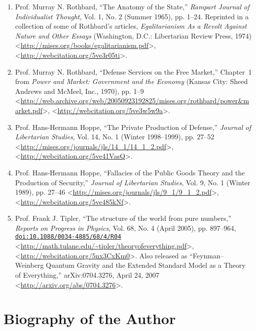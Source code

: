 \documentclass[letterpaper,12pt]{article}
\begin{document}
\begin{enumerate}
\small
\item Prof. Murray N. Rothbard, ``The Anatomy of the State,'' \emph{Rampart Journal of Individualist Thought}, Vol. 1, No. 2 (Summer 1965), pp. 1--24. Reprinted in a collection of some of Rothbard's articles, \emph{Egalitarianism As a Revolt Against Nature and Other Essays} (Washington, D.C.: Libertarian Review Press, 1974) \textless\url{http://mises.org/books/egalitarianism.pdf}\textgreater , \textless\url{http://webcitation.org/5ve3r05ti}\textgreater .

\item Prof. Murray N. Rothbard, ``Defense Services on the Free Market,'' Chapter~1 from \emph{Power and Market: Government and the Economy} (Kansas City: Sheed Andrews and McMeel, Inc., 1970), pp. 1--9 \textless\url{http://web.archive.org/web/20050923192825/mises.org/rothbard/power&market.pdf}\textgreater , \textless\url{http://webcitation.org/5ve3w5w9a}\textgreater .

\item Prof. Hans-Hermann Hoppe, ``The Private Production of Defense,'' \emph{Journal of Libertarian Studies}, Vol. 14, No. 1 (Winter 1998--1999), pp. 27--52 \textless\url{http://mises.org/journals/jls/14_1/14_1_2.pdf}\textgreater , \textless\url{http://webcitation.org/5ve41VasQ}\textgreater .

\item Prof. Hans-Hermann Hoppe, ``Fallacies of the Public Goods Theory and the Production of Security,'' \emph{Journal of Libertarian Studies}, Vol. 9, No. 1 (Winter 1989), pp. 27--46 \textless\url{http://mises.org/journals/jls/9_1/9_1_2.pdf}\textgreater , \textless\url{http://webcitation.org/5ve485kNf}\textgreater .

\item Prof. Frank J. Tipler, ``The structure of the world from pure numbers,'' \emph{Reports on Progress in Physics}, Vol. 68, No. 4 (April 2005), pp. 897--964, \href{http://dx.doi.org/10.1088/0034-4885/68/4/R04}{\nolinkurl{doi:10.1088/0034-4885/68/4/R04}} \textless\url{http://math.tulane.edu/~tipler/theoryofeverything.pdf}\textgreater , \textless\url{http://webcitation.org/5nx3CxKm0}\textgreater . Also released as ``Feynman--Weinberg Quantum Gravity and the Extended Standard Model as a Theory of Everything,'' arXiv:0704.3276, April 24, 2007 \textless\url{http://arxiv.org/abs/0704.3276}\textgreater .
\end{enumerate}

\section{Biography of the Author}
\label{sec:BiographyOfTheAuthor}
\end{document}
